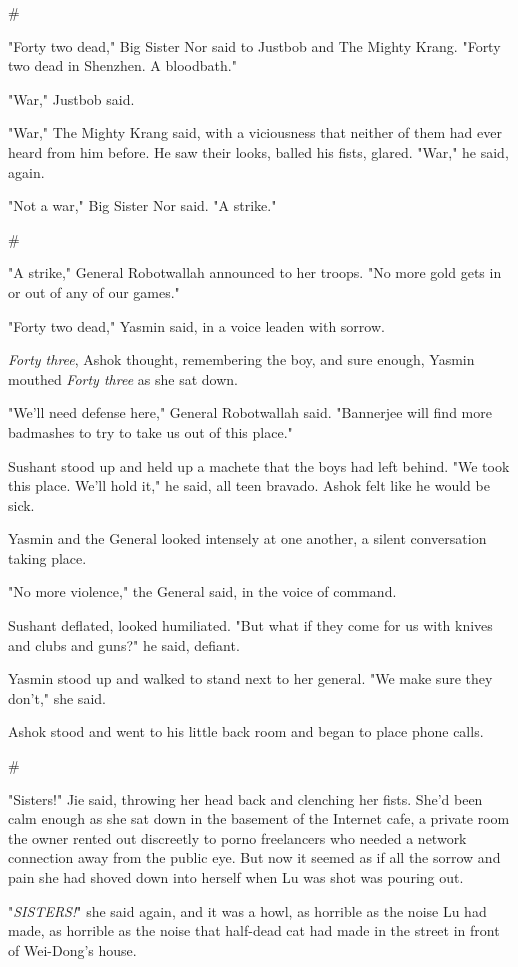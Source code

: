\#

"Forty two dead," Big Sister Nor said to Justbob and The Mighty
Krang. "Forty two dead in Shenzhen. A bloodbath."

"War," Justbob said.

"War," The Mighty Krang said, with a viciousness that neither of
them had ever heard from him before. He saw their looks, balled his
fists, glared. "War," he said, again.

"Not a war," Big Sister Nor said. "A strike."

\#

"A strike," General Robotwallah announced to her troops. "No more
gold gets in or out of any of our games."

"Forty two dead," Yasmin said, in a voice leaden with sorrow.

\emph{Forty three}, Ashok thought, remembering the boy, and sure
enough, Yasmin mouthed \emph{Forty three} as she sat down.

"We'll need defense here," General Robotwallah said. "Bannerjee
will find more badmashes to try to take us out of this place."

Sushant stood up and held up a machete that the boys had left
behind. "We took this place. We'll hold it," he said, all teen
bravado. Ashok felt like he would be sick.

Yasmin and the General looked intensely at one another, a silent
conversation taking place.

"No more violence," the General said, in the voice of command.

Sushant deflated, looked humiliated. "But what if they come for us
with knives and clubs and guns?" he said, defiant.

Yasmin stood up and walked to stand next to her general. "We make
sure they don't," she said.

Ashok stood and went to his little back room and began to place
phone calls.

\#

"Sisters!" Jie said, throwing her head back and clenching her
fists. She'd been calm enough as she sat down in the basement of
the Internet cafe, a private room the owner rented out discreetly
to porno freelancers who needed a network connection away from the
public eye. But now it seemed as if all the sorrow and pain she had
shoved down into herself when Lu was shot was pouring out.

"\emph{SISTERS!}" she said again, and it was a howl, as horrible as
the noise Lu had made, as horrible as the noise that half-dead cat
had made in the street in front of Wei-Dong's house.

